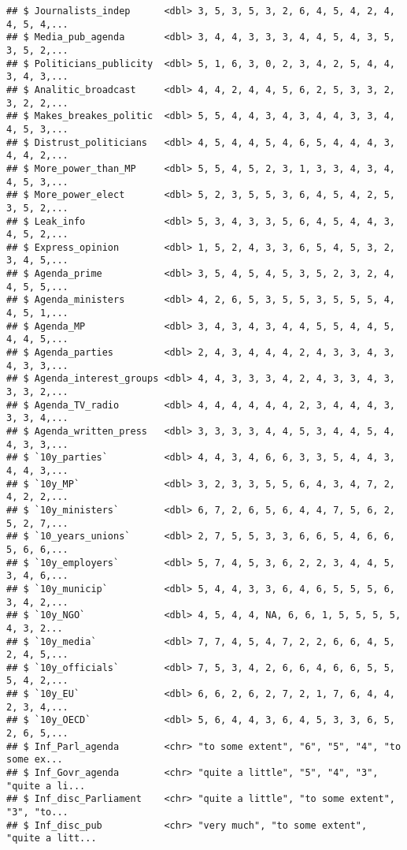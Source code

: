 \documentclass[
]{article}
\begin{document}
\begin{verbatim}
## $ Journalists_indep      <dbl> 3, 5, 3, 5, 3, 2, 6, 4, 5, 4, 2, 4, 4, 5, 4,...
## $ Media_pub_agenda       <dbl> 3, 4, 4, 3, 3, 3, 4, 4, 5, 4, 3, 5, 3, 5, 2,...
## $ Politicians_publicity  <dbl> 5, 1, 6, 3, 0, 2, 3, 4, 2, 5, 4, 4, 3, 4, 3,...
## $ Analitic_broadcast     <dbl> 4, 4, 2, 4, 4, 5, 6, 2, 5, 3, 3, 2, 3, 2, 2,...
## $ Makes_breakes_politic  <dbl> 5, 5, 4, 4, 3, 4, 3, 4, 4, 3, 3, 4, 4, 5, 3,...
## $ Distrust_politicians   <dbl> 4, 5, 4, 4, 5, 4, 6, 5, 4, 4, 4, 3, 4, 4, 2,...
## $ More_power_than_MP     <dbl> 5, 5, 4, 5, 2, 3, 1, 3, 3, 4, 3, 4, 4, 5, 3,...
## $ More_power_elect       <dbl> 5, 2, 3, 5, 5, 3, 6, 4, 5, 4, 2, 5, 3, 5, 2,...
## $ Leak_info              <dbl> 5, 3, 4, 3, 3, 5, 6, 4, 5, 4, 4, 3, 4, 5, 2,...
## $ Express_opinion        <dbl> 1, 5, 2, 4, 3, 3, 6, 5, 4, 5, 3, 2, 3, 4, 5,...
## $ Agenda_prime           <dbl> 3, 5, 4, 5, 4, 5, 3, 5, 2, 3, 2, 4, 4, 5, 5,...
## $ Agenda_ministers       <dbl> 4, 2, 6, 5, 3, 5, 5, 3, 5, 5, 5, 4, 4, 5, 1,...
## $ Agenda_MP              <dbl> 3, 4, 3, 4, 3, 4, 4, 5, 5, 4, 4, 5, 4, 4, 5,...
## $ Agenda_parties         <dbl> 2, 4, 3, 4, 4, 4, 2, 4, 3, 3, 4, 3, 4, 3, 3,...
## $ Agenda_interest_groups <dbl> 4, 4, 3, 3, 3, 4, 2, 4, 3, 3, 4, 3, 3, 3, 2,...
## $ Agenda_TV_radio        <dbl> 4, 4, 4, 4, 4, 4, 2, 3, 4, 4, 4, 3, 3, 3, 4,...
## $ Agenda_written_press   <dbl> 3, 3, 3, 3, 4, 4, 5, 3, 4, 4, 5, 4, 4, 3, 3,...
## $ `10y_parties`          <dbl> 4, 4, 3, 4, 6, 6, 3, 3, 5, 4, 4, 3, 4, 4, 3,...
## $ `10y_MP`               <dbl> 3, 2, 3, 3, 5, 5, 6, 4, 3, 4, 7, 2, 4, 2, 2,...
## $ `10y_ministers`        <dbl> 6, 7, 2, 6, 5, 6, 4, 4, 7, 5, 6, 2, 5, 2, 7,...
## $ `10_years_unions`      <dbl> 2, 7, 5, 5, 3, 3, 6, 6, 5, 4, 6, 6, 5, 6, 6,...
## $ `10y_employers`        <dbl> 5, 7, 4, 5, 3, 6, 2, 2, 3, 4, 4, 5, 3, 4, 6,...
## $ `10y_municip`          <dbl> 5, 4, 4, 3, 3, 6, 4, 6, 5, 5, 5, 6, 3, 4, 2,...
## $ `10y_NGO`              <dbl> 4, 5, 4, 4, NA, 6, 6, 1, 5, 5, 5, 5, 4, 3, 2...
## $ `10y_media`            <dbl> 7, 7, 4, 5, 4, 7, 2, 2, 6, 6, 4, 5, 2, 4, 5,...
## $ `10y_officials`        <dbl> 7, 5, 3, 4, 2, 6, 6, 4, 6, 6, 5, 5, 5, 4, 2,...
## $ `10y_EU`               <dbl> 6, 6, 2, 6, 2, 7, 2, 1, 7, 6, 4, 4, 2, 3, 4,...
## $ `10y_OECD`             <dbl> 5, 6, 4, 4, 3, 6, 4, 5, 3, 3, 6, 5, 2, 6, 5,...
## $ Inf_Parl_agenda        <chr> "to some extent", "6", "5", "4", "to some ex...
## $ Inf_Govr_agenda        <chr> "quite a little", "5", "4", "3", "quite a li...
## $ Inf_disc_Parliament    <chr> "quite a little", "to some extent", "3", "to...
## $ Inf_disc_pub           <chr> "very much", "to some extent", "quite a litt...

\end{verbatim}
\end{document}
